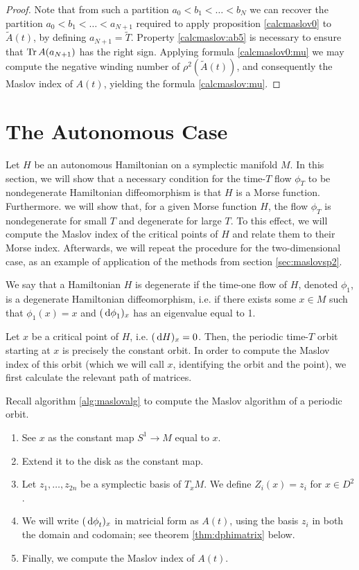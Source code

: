 \begin{proof}
Note that from such a partition $a_0 < b_1 < \dots < b_N$ we can recover the partition $a_0 < b_1 < \dots < a_{N+1}$ required to apply proposition \ref{calcmaslov0} to $\tilde A(t)$, by defining $a_{N+1} = \tilde T$. Property \ref{calcmaslov:ab5} is necessary to ensure that $\operatorname{Tr} A(a_{N+1})$ has the right sign. Applying formula \eqref{calcmaslov0:mu} we may compute the negative winding number of $\rho^2(\tilde A(t))$, and consequently the Maslov index of $A(t)$, yielding the formula \ref{calcmaslov:mu}.
\end{proof}

\section{The Autonomous Case}

Let $H$ be an autonomous Hamiltonian on a symplectic manifold $M$. In this section, we will show that a necessary condition for the time-$T$ flow $\phi_T$ to be nondegenerate Hamiltonian diffeomorphism is that $H$ is a Morse function. Furthermore. we will show that, for a given Morse function $H$, the flow $\phi_T$ is nondegenerate for small $T$ and degenerate for large $T$. To this effect, we will compute the Maslov index of the critical points of $H$ and relate them to their Morse index. Afterwards, we will repeat the procedure for the two-dimensional case, as an example of application of the methods from section \ref{sec:maslovsp2}.

\begin{definition}
We say that a Hamiltonian $H$ is degenerate if the time-one flow of $H$, denoted $\phi_1$, is a degenerate Hamiltonian diffeomorphism, i.e. if there exists some $x \in M$ such that $\phi_1(x) = x$ and $(\dl \phi_1)_x$ has an eigenvalue equal to 1.
\end{definition}

Let $x$ be a critical point of $H$, i.e. $(\dl H)_x = 0$. Then, the periodic time-$T$ orbit starting at $x$ is precisely the constant orbit. In order to compute the Maslov index of this orbit (which we will call $x$, identifying the orbit and the point), we first calculate the relevant path of matrices.

Recall algorithm \ref{alg:maslovalg} to compute the Maslov algorithm of a periodic orbit.
\begin{enumerate}[algorithm]
\item See $x$ as the constant map $S^1 \to M$ equal to $x$.
\item Extend it to the disk as the constant map.
\item Let $z_1, \dots, z_{2n}$ be a symplectic basis of $T_x M$. We define $Z_i(x) = z_i$ for $x \in D^2$.
\item We will write $(\dl \phi_t)_x$ in matricial form as $A(t)$, using the basis $z_i$ in both the domain and codomain; see theorem \ref{thm:dphimatrix} below.
\item Finally, we compute the Maslov index of $A(t)$.
\end{enumerate}


